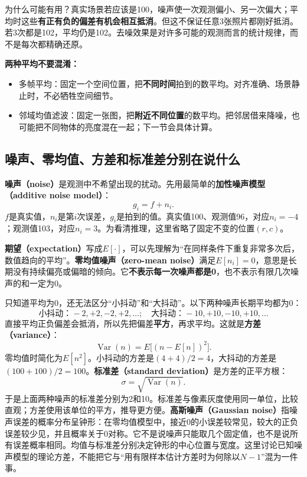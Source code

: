 为什么可能有用？真实场景若应该是100，噪声使一次观测偏小、另一次偏大；平均时这些\textbf{有正有负的偏差有机会相互抵消}。但这不保证任意3张照片都刚好抵消。若3次都是102，平均仍是102。去噪效果是对许多可能的观测而言的统计规律，而不是每次都精确还原。

\textbf{两种平均不要混淆：}
\begin{itemize}
  \item 多帧平均：固定一个空间位置，把\textbf{不同时间}拍到的数平均。对齐准确、场景静止时，不必牺牲空间细节。
  \item 邻域均值滤波：固定一张图，把\textbf{附近不同位置}的数平均。把邻居借来降噪，也可能把不同物体的亮度混在一起；下一节会具体计算。
\end{itemize}

\subsection{噪声、零均值、方差和标准差分别在说什么}
\textbf{噪声（noise）}是观测中不希望出现的扰动。先用最简单的\textbf{加性噪声模型（additive noise model）}：
\[
  g_i=f+n_i.
\]
$f$是真实值，$n_i$是第$i$次误差，$g_i$是拍到的值。真实值100、观测值96，对应$n_i=-4$；观测值103，对应$n_i=3$。为看清推理，这里省略了固定不变的位置$(r,c)$。

\textbf{期望（expectation）}写成$E[\cdot]$，可以先理解为“在同样条件下重复非常多次后，数值趋向的平均”。\textbf{零均值噪声（zero-mean noise）}满足$E[n_i]=0$，意思是长期没有持续偏亮或偏暗的倾向。它\textbf{不表示每一次噪声都是0}，也不表示有限几次噪声的和一定为0。

只知道平均为0，还无法区分“小抖动”和“大抖动”。以下两种噪声长期平均都为0：
\[
  \text{小抖动：}-2,+2,-2,+2,\ldots;
  \quad\text{大抖动：}-10,+10,-10,+10,\ldots
\]
直接平均正负偏差会抵消，所以先把偏差\textbf{平方}，再求平均。这就是\textbf{方差（variance）}：
\[
  \operatorname{Var}(n)=E\bigl[(n-E[n])^2\bigr].
\]
零均值时简化为$E[n^2]$。小抖动的方差是$(4+4)/2=4$，大抖动的方差是$(100+100)/2=100$。\textbf{标准差（standard deviation）}是方差的正平方根：
\[
  \sigma=\sqrt{\operatorname{Var}(n)}.
\]
于是上面两种噪声的标准差分别为2和10。标准差与像素灰度使用同一单位，比较直观；方差使用该单位的平方，推导更方便。\textbf{高斯噪声（Gaussian noise）}指噪声误差的概率分布呈钟形：在零均值模型中，接近0的小误差较常见，较大的正负误差较少见，并且概率关于0对称。它不是说噪声只能取几个固定值，也不是说所有误差概率相同。均值与标准差分别决定钟形的中心位置与宽度。这里讨论已知噪声模型的理论方差，不能把它与“用有限样本估计方差时为何除以$N-1$”混为一件事。

